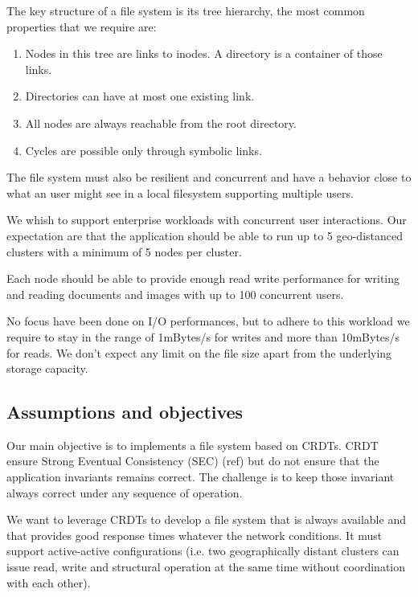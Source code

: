 \documentclass[sigplan, 10pt]{acmart}
\begin{document}
The key structure of a file system is its tree hierarchy, the most common
properties that we require are:

\begin{enumerate}
    \item Nodes in this tree are links to inodes. A directory is a container
    of those links.
    \item Directories can have at most one existing link.
    \item All nodes are always reachable from the root directory.
    \item Cycles are possible only through symbolic links.
\end{enumerate}

The file system must also be resilient and concurrent and
have a behavior close to what an user might see in a local filesystem
supporting multiple users.

We whish to support enterprise workloads with concurrent user interactions. Our
expectation are that the application should be able to run up to 5
geo-distanced clusters with a minimum of 5 nodes per cluster.

Each node should be able to provide enough read write performance
for writing and reading documents and images with up to 100 concurrent users.

No focus have been done on I/O performances, but to adhere to this
workload we require to stay in the range of 1mBytes/s for writes
and more than 10mBytes/s for reads. We don't expect any limit on the file size
apart from the underlying storage capacity.

\subsection{Assumptions and objectives}

Our main objective is to implements a file system based on CRDTs. CRDT
ensure Strong Eventual Consistency (SEC) (ref) but do
not ensure that the application invariants remains correct. The challenge
is to keep those invariant always correct under any sequence of
operation.

We want to leverage CRDTs to develop a file system that is always available
and that provides good response times whatever the network conditions.
It must support active-active configurations (i.e. two geographically distant
clusters can issue read, write and structural operation at the same time without
coordination with each other).
\end{document}
